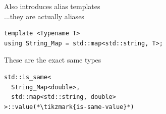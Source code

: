 \documentclass[14pt]{beamer}
\begin{document}
\begin{frame}[fragile]
\begin{onlyenv}
    Also introduces alias templates \\
    {\changefontsize{10pt}...they are actually aliases}

    \vspace{.25cm}

    \begin{lstlisting}[basicstyle=\codefontsize{11pt}]
template <Typename T>
using String_Map = std::map<std::string, T>;
    \end{lstlisting}

    \vfill

    These are the exact same types

    \begin{lstlisting}[basicstyle=\codefontsize{11pt},morekeywords={String_Map}]
std::is_same<
  String_Map<double>,
  std::map<std::string, double>
>::value(*\tikzmark{is-same-value}*)
    \end{lstlisting}
    
    \nointerlineskip

  \end{onlyenv}

\end{frame}
\end{document}

